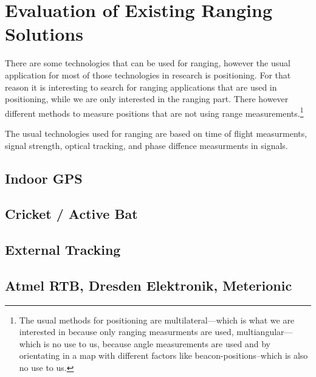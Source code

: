 \section{Evaluation of Existing Ranging Solutions}
There are some technologies that can be used for ranging, however the usual application for most of those technologies in research is positioning.
For that reason it is interesting to search for ranging applications that are used in positioning, while we are only interested in the ranging part. 
There however different methods to measure positions that are not using range measurements.\footnote{The usual methods for positioning are multilateral—which is what we are interested in because only ranging measurments are used, multiangular—which is no use  to us, because angle measurements are used and by orientating in a map with different factors like beacon-positions–which is also no use to us.}

The usual technologies used for ranging are based on time of flight measurments, signal strength, optical tracking, and phase diffence measurments in signals.

\subsection{Indoor GPS}
\subsection{Cricket / Active Bat}
\subsection{External Tracking}
\subsection{Atmel RTB, Dresden Elektronik, Meterionic}
